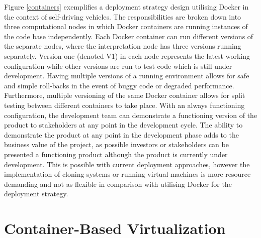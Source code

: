 Figure \ref{containers} exemplifies a deployment strategy design utilising Docker in the context of self-driving vehicles. The responsibilities are broken down into three computational nodes in which Docker containers are running instances of the code base independently. Each Docker container can run different versions of the separate nodes, where the interpretation node has three versions running separately. Version one (denoted V1) in each node represents the latest working configuration while other versions are run to test code which is still under development. Having multiple versions of a running environment allows for safe and simple roll-backs in the event of buggy code or degraded performance. Furthermore, multiple versioning of the same Docker container allows for split testing between different containers to take place. With an always functioning configuration, the development team can demonstrate a functioning version of the product to stakeholders at any point in the development cycle. The ability to demonstrate the product at any point in the development phase adds to the business value of the project, as possible investors or stakeholders can be presented a functioning product although the product is currently under development. This is possible with current deployment approaches, however the implementation of cloning systems or running virtual machines is more resource demanding \cite{vmvscontainers} and not as flexible in comparison with utilising Docker for the deployment strategy.


\section{Container-Based Virtualization}

